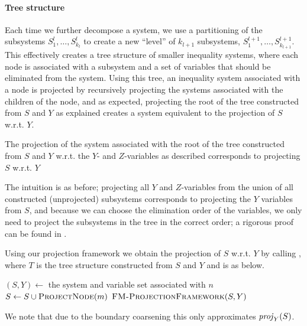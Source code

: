 \paragraph{Tree structure}
Each time we further decompose a system, we use a partitioning of the subsystems $S^l_1, \ldots, S^l_{k_l}$ to create a new ``level'' of $k_{l+1}$ subsystems, $S^{l+1}_1,\ldots, S^{l+1}_{k_{l+1}}$. This effectively creates a tree structure of smaller inequality systems, where each node is associated with a subsystem and a set of variables that should be eliminated from the system. 
%
%
Using this tree, an inequality system associated with a node is projected by recursively projecting the systems associated with the children of the node, and as expected, projecting the root of the tree constructed from $S$ and $Y$ as explained creates a system equivalent to the projection of $S$ w.r.t. $Y$. 

\begin{prop}
The projection of the system associated with the root of the tree constructed from $S$ and $Y$ w.r.t. the $Y$- and $Z$-variables as described corresponds to projecting $S$ w.r.t. $Y$
\end{prop}
%
The intuition is as before; projecting all $Y$ and $Z$-variables from the union of all constructed (unprojected) subsystems corresponds to projecting the $Y$ variables from $S$, and because we can choose the elimination order of the variables, we only need to project the subsystems in the tree in the correct order; a rigorous proof can be found in \cite{MyTechRep}.

Using our projection framework we obtain the projection of $S$ w.r.t. $Y$ by calling , where $T$ is the tree structure constructed from $S$ and $Y$ and  is as below.

\begin{algorithmic}
	\State $(S,Y)\gets$ the system and variable set associated with $n$
		\State \Return {}
	\Else
			\State $S \gets S\cup \Call{ProjectNode}{m}$
		\EndFor
		\State \Return $\Call{FM-ProjectionFramework}{S, Y}$
	\EndIf
\EndFunction
\end{algorithmic}
We note that due to the boundary coarsening this only approximates $\mathit{proj}_Y(S)$.
